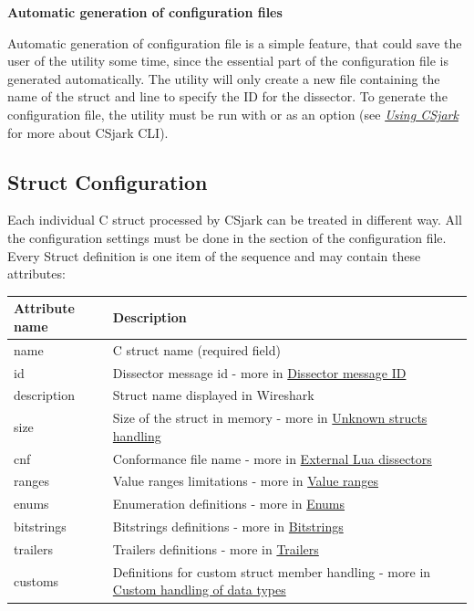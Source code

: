 \documentclass[A4paper,10pt,english]{sphinxmanual}
\begin{document}
\textbf{Automatic generation of configuration files}

Automatic generation of configuration file is a simple feature, that could save the user of the utility some time, since  the essential part of the configuration file is generated automatically.  The utility will only create a new file containing the name of the struct and line to specify the ID for the dissector.  To generate the configuration file, the utility must be run with  or  as an option (see {\hyperref[user/use:use]{\emph{Using CSjark}}} for more about CSjark CLI).


\subsection{Struct Configuration}
\label{user/config:struct-configuration}
Each individual C struct processed by CSjark can be treated in different way. All the configuration settings must be done in the  section of the configuration file. Every Struct definition is one item of the sequence and may contain these attributes:

\begin{tabulary}{\linewidth}{|L|L|}
\hline
\textbf{
Attribute name
} & \textbf{
Description
}\\\hline

name
 & 
C struct name (required field)
\\\hline

id
 & 
Dissector message id - more in {\hyperref[user/config:dissector-message-id]{Dissector message ID}}
\\\hline

description
 & 
Struct name displayed in Wireshark
\\\hline

size
 & 
Size of the struct in memory - more in {\hyperref[user/config:unknown-structs-handling]{Unknown structs handling}}
\\\hline

cnf
 & 
Conformance file name - more in {\hyperref[user/config:external-lua-dissectors]{External Lua dissectors}}
\\\hline

ranges
 & 
Value ranges limitations - more in {\hyperref[user/config:value-ranges]{Value ranges}}
\\\hline

enums
 & 
Enumeration definitions - more in {\hyperref[user/config:enums]{Enums}}
\\\hline

bitstrings
 & 
Bitstrings definitions - more in {\hyperref[user/config:bitstrings]{Bitstrings}}
\\\hline

trailers
 & 
Trailers definitions - more in {\hyperref[user/config:trailers]{Trailers}}
\\\hline

customs
 & 
Definitions for custom struct member handling - more in {\hyperref[user/config:custom-handling-of-data-types]{Custom handling of data types}}
\\\hline
\end{tabulary}
\end{document}
